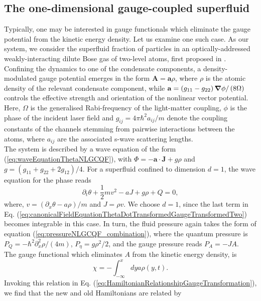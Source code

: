 \documentclass[twocolumn, nofootinbib, nobibnotes, amsmath,amssymb,aps, pra, floatfix]{revtex4-1}
\renewcommand{\v}[1]{\ensuremath{\mathbf{#1}}} %
\newcommand{\gv}[1]{\ensuremath{\mbox{\boldmath$ #1 $}}} %
\newcommand{\grad}[1]{\gv{\nabla} #1} %
\begin{document}
\subsection{\label{sec:oneDimSuperfluid}The one-dimensional gauge-coupled superfluid}
Typically, one may be interested in gauge functionals which eliminate the gauge potential from the kinetic energy density.
Let us examine one such case.
As our system, we consider the superfluid fraction of particles in an optically-addressed weakly-interacting dilute Bose gas of two-level atoms, first proposed in \cite{edmonds2013}.
Confining the dynamics to one of the condensate components, a density-modulated gauge potential emerges in the form $\v{A}=\v{a}\rho$, where $\rho$ is the atomic density of the relevant condensate component, while $\v{a}=\left(g_{11}-g_{22}\right)\grad{\phi}/\left(8\Omega\right)$ controls the effective strength and orientation of the nonlinear vector potential.
Here, $\Omega$ is the generalised Rabi-frequency of the light-matter coupling, $\phi$ is the phase of the incident laser field and $g_{ij}=4\pi\hbar^2a_{ij}/m$ denote the coupling constants of the channels stemming from pairwise interactions between the atoms, where $a_{ij}$ are the associated s-wave scattering lengths.\\
The system is described by a wave equation of the form (\ref{eq:waveEquationThetaNLGCQF}), with $\Phi=-\v{a}\cdot\v{J}+g\rho$ and $g=\left(g_{11}+g_{22}+2g_{12}\right)/4$.
For a superfluid confined to dimension $d=1$, the wave equation for the phase reads  
\begin{equation}
  \partial_t\theta+\frac{1}{2}mv^2-aJ+g\rho+Q=0,
  \label{eq:QHJEDensityModulatedGaugePotentialOneDimension}
\end{equation}
where, $v=\left( \partial_x\theta-a\rho \right)/m$ and $J=\rho v$.
We choose $d=1$, since the last term in Eq. (\ref{eq:canonicalFieldEquationThetaDotTransformedGaugeTransformedTwo}) becomes integrable in this case.
In turn, the fluid pressure again takes the form of equation (\ref{eq:pressureNLGCQF_combination}), where the quantum pressure is $P_Q = -\hbar^2\partial_x^2\rho/(4m)$, $P_{\eta} = g\rho^2/2$, and the gauge pressure reads $P_A=-JA$.\\
The gauge functional which eliminates $A$ from the kinetic energy density, is
\begin{equation}
  \chi=-\int_{-\infty}^x dy a \rho\left( y,t \right).
  \label{eq:gaugeFunctionOneDimensionalSystem}
\end{equation}
Invoking this relation in Eq. (\ref{eq:HamiltonianRelationshipGaugeTransformation}), we find that the new and old Hamiltonians are related by
\end{document}
